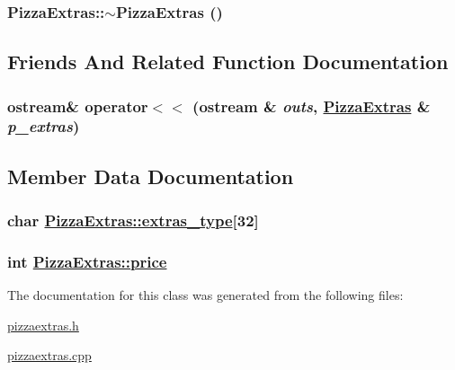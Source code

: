 \hypertarget{class_pizza_extras_d1b99435e0c475e0e058749ec6cd9ff6}{
\subsubsection[$\sim$PizzaExtras]{\setlength{\rightskip}{0pt plus 5cm}Pizza\-Extras::$\sim$Pizza\-Extras ()}}
\label{class_pizza_extras_d1b99435e0c475e0e058749ec6cd9ff6}




\subsection{Friends And Related Function Documentation}
\hypertarget{class_pizza_extras_01be6c7f4cc0dae56b875e6179844126}{
\subsubsection[operator$<$$<$]{\setlength{\rightskip}{0pt plus 5cm}ostream\& operator$<$$<$ (ostream \& {\em outs}, \hyperlink{class_pizza_extras}{Pizza\-Extras} \& {\em p\_\-extras})}}
\label{class_pizza_extras_01be6c7f4cc0dae56b875e6179844126}




\subsection{Member Data Documentation}
\hypertarget{class_pizza_extras_22c51029f6700dc22d22c0f972ff904e}{
\subsubsection[extras\_\-type]{\setlength{\rightskip}{0pt plus 5cm}char \hyperlink{class_pizza_extras_22c51029f6700dc22d22c0f972ff904e}{Pizza\-Extras::extras\_\-type}\mbox{[}32\mbox{]}}}
\label{class_pizza_extras_22c51029f6700dc22d22c0f972ff904e}


\hypertarget{class_pizza_extras_78a5eb43deef9a7b5b9ce157b9d52ac4}{
\subsubsection[price]{\setlength{\rightskip}{0pt plus 5cm}int \hyperlink{class_pizza_extras_78a5eb43deef9a7b5b9ce157b9d52ac4}{Pizza\-Extras::price}}}
\label{class_pizza_extras_78a5eb43deef9a7b5b9ce157b9d52ac4}




The documentation for this class was generated from the following files:\begin{CompactItemize}
\item 
\hyperlink{pizzaextras_8h}{pizzaextras.h}\item 
\hyperlink{pizzaextras_8cpp}{pizzaextras.cpp}\end{CompactItemize}
